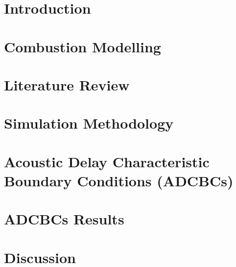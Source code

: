 \documentclass[lmr,second,hyperref,rgb,hyperref,dvipsnames]{uom_thesis_casson}
\title{\xmp@Title}
\author{\xmp@Author}
\begin{document}
\maketitle
\cleardoublepage

% 

\pagestyle{fancy}
\setcounter{page}{5}

\thispagestyle{empty}
\cleardoublepage

\uomtoc
\cleardoublepage

\uomstartmainbody %

\chapter{Introduction} \label{ch:intro}

\cleardoublepage

\chapter{Combustion Modelling} \label{ch:combust-model}

\cleardoublepage

\chapter{Literature Review} \label{ch:lit-review}

\cleardoublepage

\chapter{Simulation Methodology} \label{ch:dns-methods}

\cleardoublepage

% 

\chapter{Acoustic Delay Characteristic Boundary Conditions (ADCBCs)} \label{ch:delay-bcs}

\cleardoublepage

\chapter{ADCBCs Results} \label{ch:results}

\cleardoublepage

\chapter{Discussion} \label{ch:discuss}

\cleardoublepage

\printbibliography[title={References}, heading=bibintoc]
\end{document}
